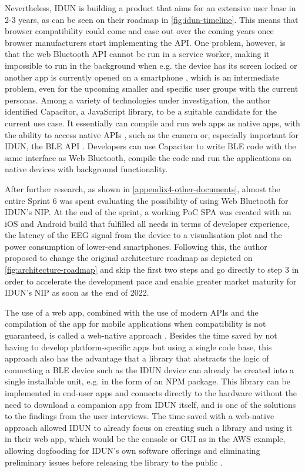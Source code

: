 Nevertheless, IDUN is building a product that aims for an extensive user base in 2-3 years, as can be seen on their roadmap in \autoref{fig:idun-timeline}. This means that browser compatibility could come and ease out over the coming years once browser manufacturers start implementing the API. One problem, however, is that the web Bluetooth API cannot be run in a service worker, making it impossible to run in the background when e.g. the device has its screen locked or another app is currently opened on a smartphone \citep{webbluetoothcg_service_2018}, which is an intermediate problem, even for the upcoming smaller and specific user groups with the current personas. Among a variety of technologies under investigation, the author identified Capacitor, a JavaScript library, to be a suitable candidate for the current use case. It essentially can compile and run web apps as native apps, with the ability to access native APIs \citep{ionic_capacitor_nodate}, such as the camera or, especially important for IDUN, the BLE API \citep{capacitor-community_capacitor-communitybluetooth-_2022}. Developers can use Capacitor to write BLE code with the same interface as Web Bluetooth, compile the code and run the applications on native devices with background functionality.

After further research, as shown in \autoref{appendix4-other-documents}, almost the entire Sprint 6 was spent evaluating the possibility of using Web Bluetooth for IDUN's NIP. At the end of the sprint, a working PoC SPA was created with an iOS and Android build that fulfilled all needs in terms of developer experience, the latency of the EEG signal from the device to a visualisation plot and the power consumption of lower-end smartphones. Following this, the author proposed to change the original architecture roadmap as depicted on \autoref{fig:architecture-roadmap} and skip the first two steps and go directly to step 3 in order to accelerate the development pace and enable greater market maturity for IDUN's NIP as soon as the end of 2022.

The use of a web app, combined with the use of modern APIs and the compilation of the app for mobile applications when compatibility is not guaranteed, is called a web-native approach \citep{ionic_web_nodate}. Besides the time saved by not having to develop platform-specific apps but using a single code base, this approach also has the advantage that a library that abstracts the logic of connecting a BLE device such as the IDUN device can already be created into a single installable unit, e.g. in the form of an NPM package. This library can be implemented in end-user apps and connects directly to the hardware without the need to download a companion app from IDUN itself, and is one of the solutions to the findings from the user interviews. The time saved with a web-native approach allowed IDUN to already focus on creating such a library and using it in their web app, which would be the console or GUI as in the AWS example, allowing dogfooding for IDUN's own software offerings and eliminating preliminary issues before releasing the library to the public \citep{techopedia_what_2016}.

